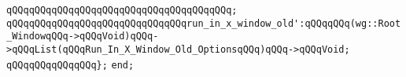 \verb|qQQqqQQqqQQqqQQqqQQqqQQqqQQqqQQqqQQqqQQq;|\newline
\newline
\verb|qQQqqQQqqQQqqQQqqQQqqQQqqQQqqQQqrun_in_x_window_old':qQQqqQQq(wg::Root_WindowqQQq->qQQqVoid)qQQq->qQQqList(qQQqRun_In_X_Window_Old_OptionsqQQq)qQQq->qQQqVoid;|\newline
\verb|qQQqqQQqqQQqqQQq};|\newline
\newline
\verb|end;|\newline
\newline

